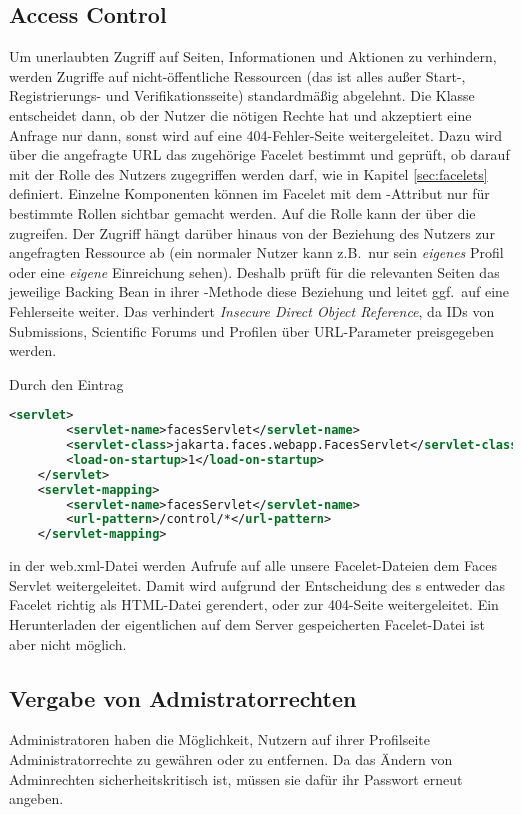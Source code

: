 \subsection{Access Control}\label{subsec:access-control}
Um unerlaubten Zugriff auf Seiten, Informationen und Aktionen zu verhindern, werden Zugriffe auf nicht-öffentliche Ressourcen (das ist alles außer Start-, Registrierungs- und Verifikationsseite) standardmäßig abgelehnt.
Die Klasse  entscheidet dann, ob der Nutzer die nötigen Rechte hat und akzeptiert eine Anfrage nur dann, sonst wird auf eine 404-Fehler-Seite weitergeleitet.
Dazu wird über die angefragte URL das zugehörige Facelet bestimmt und geprüft, ob darauf mit der Rolle des Nutzers zugegriffen werden darf, wie in Kapitel \ref{sec:facelets} definiert.
Einzelne Komponenten können im Facelet mit dem -Attribut nur für bestimmte Rollen sichtbar gemacht werden.
Auf die Rolle kann der  über die  zugreifen.
Der Zugriff hängt darüber hinaus von der Beziehung des Nutzers zur angefragten Ressource ab (ein normaler Nutzer kann z.B.\ nur sein \emph{eigenes} Profil oder eine \emph{eigene} Einreichung sehen).
Deshalb prüft für die relevanten Seiten das jeweilige Backing Bean in ihrer -Methode diese Beziehung und leitet ggf.\ auf eine Fehlerseite weiter.
Das verhindert \emph{Insecure Direct Object Reference}, da IDs von Submissions, Scientific Forums und Profilen über URL-Parameter preisgegeben werden.

Durch den Eintrag
\begin{lstlisting}[language=XML]
    <servlet>
        <servlet-name>facesServlet</servlet-name>
        <servlet-class>jakarta.faces.webapp.FacesServlet</servlet-class>
        <load-on-startup>1</load-on-startup>
    </servlet>
    <servlet-mapping>
        <servlet-name>facesServlet</servlet-name>
        <url-pattern>/control/*</url-pattern>
    </servlet-mapping>
\end{lstlisting}
in der web.xml-Datei werden Aufrufe auf alle unsere Facelet-Dateien dem Faces Servlet weitergeleitet.
Damit wird aufgrund der Entscheidung des s entweder das Facelet richtig als HTML-Datei gerendert, oder zur 404-Seite weitergeleitet. Ein Herunterladen der eigentlichen auf dem Server gespeicherten Facelet-Datei ist aber nicht möglich.

\subsection{Vergabe von Admistratorrechten}
Administratoren haben die Möglichkeit, Nutzern auf ihrer Profilseite Administratorrechte zu gewähren oder zu entfernen.
Da das Ändern von Adminrechten sicherheitskritisch ist, müssen sie dafür ihr Passwort erneut angeben.